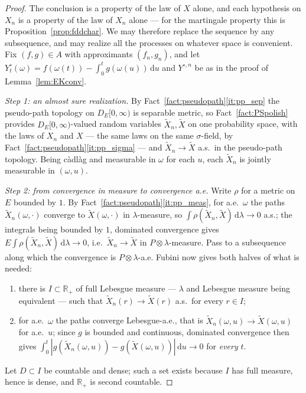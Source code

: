 \documentclass[11pt,a4paper]{article}
\theoremstyle{plain}
\theoremstyle{definition}
\theoremstyle{remark}
\newcommand{\R}{\mathbb{R}}
\newcommand{\Rp}{\R_+}
\newcommand{\DE}{D_E[0,\infty)}
\newcommand{\dif}{\,\mathrm{d}}
\begin{document}
\begin{proof}
  The conclusion is a property of the law of $X$ alone, and each hypothesis on
  $X_n$ is a property of the law of $X_n$ alone --- for the martingale property
  this is Proposition~\ref{prop:fddchar}.  We may therefore replace the sequence
  by any subsequence, and may realize all the processes on whatever space is
  convenient.  Fix $(f,g) \in A$ with approximants $(f_n,g_n)$, and let
  $Y^\circ_t(\omega) = f(\omega(t)) - \int_0^t g(\omega(u))\dif u$ and
  $Y^{\circ,n}$ be as in the proof of Lemma~\ref{lem:EKconv}.

  \emph{Step 1: an almost sure realization.}  By
  Fact~\ref{fact:pseudopath}\ref{it:pp_sep} the pseudo-path topology on $\DE$ is
  separable metric, so Fact~\ref{fact:PSpolish} provides $\DE$-valued random
  variables $\tilde X_n, \tilde X$ on one probability space, with the laws of
  $X_n$ and $X$ --- the same laws on the same $\sigma$-field, by
  Fact~\ref{fact:pseudopath}\ref{it:pp_sigma} --- and $\tilde X_n \to \tilde X$
  a.s.\ in the pseudo-path topology.  Being c\`adl\`ag and measurable in $\omega$
  for each $u$, each $\tilde X_n$ is jointly measurable in $(\omega,u)$.

  \emph{Step 2: from convergence in measure to convergence a.e.}  Write $\rho$ for
  a metric on $E$ bounded by $1$.  By
  Fact~\ref{fact:pseudopath}\ref{it:pp_meas}, for a.e.\ $\omega$ the paths
  $\tilde X_n(\omega,\cdot)$ converge to $\tilde X(\omega,\cdot)$ in
  $\lambda$-measure, so $\int \rho(\tilde X_n, \tilde X) \dif\lambda \to 0$ a.s.;
  the integrals being bounded by $1$, dominated convergence gives
  $E \int \rho(\tilde X_n,\tilde X)\dif\lambda \to 0$, i.e.\ $\tilde X_n \to
  \tilde X$ in $P \otimes \lambda$-measure.  Pass to a subsequence along which the
  convergence is $P \otimes \lambda$-a.e.  Fubini now gives both halves of what is
  needed:
  \begin{enumerate}[label=(\alph*)]
  \item \label{it:mz_fdd} there is $I \subset \Rp$ of full Lebesgue measure ---
    $\lambda$ and Lebesgue measure being equivalent --- such that
    $\tilde X_n(r) \to \tilde X(r)$ a.s.\ for every $r \in I$;
  \item \label{it:mz_int} for a.e.\ $\omega$ the paths converge Lebesgue-a.e.,
    that is $\tilde X_n(\omega,u) \to \tilde X(\omega,u)$ for a.e.\ $u$; since $g$
    is bounded and continuous, dominated convergence then gives
    $\int_0^t |g(\tilde X_n(\omega,u)) - g(\tilde X(\omega,u))| \dif u \to 0$
    for \emph{every} $t$.
  \end{enumerate}
  Let $D \subset I$ be countable and dense; such a set exists because $I$ has full
  measure, hence is dense, and $\Rp$ is second countable.


\end{proof}
\end{document}
